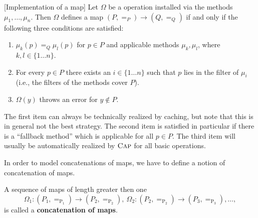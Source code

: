 \begin{remark}\label{remark:implementation_of_gap_maps}[Implementation of a \GAP map]
 Let $\Omega$ be a \GAP operation installed via the \GAP methods $\mu_1, \dots, \mu_n$.
 Then $\Omega$ defines a \GAP map $(P,=_P) \rightarrow (Q, =_Q)$ if and only if the following three conditions are satisfied:
 \begin{enumerate}
  \item $\mu_k( p ) =_Q \mu_l( p )$ for $p \in P$ and applicable methods $\mu_k, \mu_l$, where $k,l \in \{ 1 \dots n \}$.
  \item For every $p \in P$ there exists an $i \in \{ 1 \dots n \}$ such that $p$ lies in the filter of $\mu_i$ (i.e., 
  the filters of the methods cover $P$).
  \item $\Omega(y)$ throws an error for $y \not \in P$.
 \end{enumerate}
 The first item can always be technically realized by caching, but note that this is in general not the best strategy.
 The second item is satisfied in particular if there is a ``fallback method'' which is applicable for all $p \in P$.
 The third item will usually be automatically realized by $\textsc{Cap}$ for all basic operations.
\end{remark}

In order to model concatenations of maps, we have to define a notion of concatenation of \GAP maps.

\begin{definition}
 A sequence of \GAP maps of length greater then one
 \[
 \Omega_1: (P_1, =_{\mathrm{P_1}}) \rightarrow (P_2, =_{\mathrm{P_2}}), ~\Omega_2: (P_2, =_{\mathrm{P_2}}) \rightarrow (P_3, =_{\mathrm{P_3}}), \dots,
 \]
 is called a \textbf{concatenation of \GAP maps}.
\end{definition}

